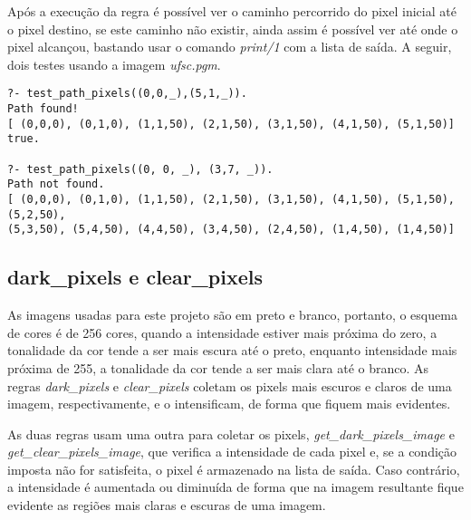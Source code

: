 \documentclass{article}
\begin{document}
        Após a execução da regra é possível ver o caminho percorrido do pixel
        inicial até o pixel destino, se este caminho não existir, ainda assim é
        possível ver até onde o pixel alcançou, bastando usar o comando
        \textit{print/1} com a lista de saída. A seguir, dois testes usando a
        imagem \textit{ufsc.pgm}.

        \begin{verbatim}
?- test_path_pixels((0,0,_),(5,1,_)).
Path found!
[ (0,0,0), (0,1,0), (1,1,50), (2,1,50), (3,1,50), (4,1,50), (5,1,50)]
true.

?- test_path_pixels((0, 0, _), (3,7, _)).
Path not found.
[ (0,0,0), (0,1,0), (1,1,50), (2,1,50), (3,1,50), (4,1,50), (5,1,50), (5,2,50),
(5,3,50), (5,4,50), (4,4,50), (3,4,50), (2,4,50), (1,4,50), (1,4,50)]
    \end{verbatim}

    \newpage
    \subsection*{dark\_pixels e clear\_pixels}
        As imagens usadas para este projeto são em preto e branco, portanto, o
        esquema de cores é de 256 cores, quando a intensidade estiver mais
        próxima do zero, a tonalidade da cor tende a ser mais escura até o
        preto, enquanto intensidade mais próxima de 255, a tonalidade da cor
        tende a ser mais clara até o branco. As regras \textit{dark\_pixels} e
        \textit{clear\_pixels} coletam os pixels mais escuros e claros de uma
        imagem, respectivamente, e o intensificam, de forma que fiquem mais
        evidentes.
        
        As duas regras usam uma outra para coletar os pixels,
        \textit{get\_dark\_pixels\_image} e \textit{get\_clear\_pixels\_image},
        que verifica a intensidade de cada pixel e, se a condição imposta não
        for satisfeita, o pixel é armazenado na lista de saída. Caso contrário,
        a intensidade é aumentada ou diminuída de forma que na imagem
        resultante fique evidente as regiões mais claras e escuras de uma
        imagem.
        
\end{document}

